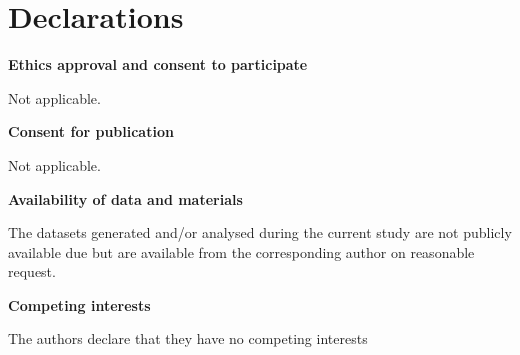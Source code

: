 \documentclass[10pt,twocolumn]{article}
\begin{document}
%



\section*{Declarations}

\begin{flushleft}
{\bf Ethics approval and consent to participate}
\end{flushleft}

Not applicable.

\begin{flushleft}
{\bf Consent for publication}
\end{flushleft}

Not applicable.

\begin{flushleft}
{\bf Availability of data and materials}
\end{flushleft}

The datasets generated and/or analysed during the current study are not publicly available due but are available from the corresponding author on reasonable request.

\begin{flushleft}
{\bf Competing interests}
\end{flushleft}

The authors declare that they have no competing interests
\end{document}
